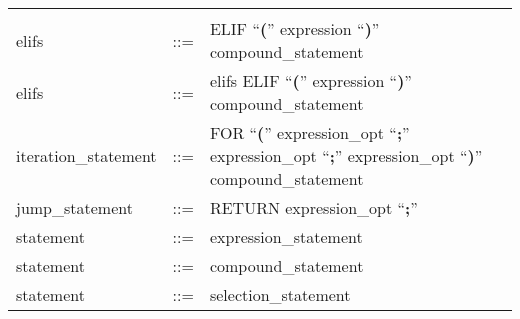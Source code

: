\begin{longtable}{lrl}
\begin{minipage}[t]{\rulerhs}
  \end{minipage}                                                             \\
elifs                                      & ::= &
  \begin{minipage}[t]{\rulerhs}
    \raggedright
    ELIF ``{\bf (}'' expression ``{\bf )}'' compound\_statement
  \end{minipage}                                                             \\
elifs                                      & ::= &
  \begin{minipage}[t]{\rulerhs}
    \raggedright
    elifs ELIF ``{\bf (}'' expression ``{\bf )}'' compound\_statement
  \end{minipage}                                                             \\
iteration\_statement                       & ::= &
  \begin{minipage}[t]{\rulerhs}
    \raggedright
    FOR ``{\bf (}'' expression\_opt ``{\bf ;}'' expression\_opt ``{\bf ;}'' expression\_opt ``{\bf )}'' compound\_statement
  \end{minipage}                                                             \\
jump\_statement                            & ::= &
  \begin{minipage}[t]{\rulerhs}
    \raggedright
    RETURN expression\_opt ``{\bf ;}''
  \end{minipage}                                                             \\
statement                                  & ::= &
  \begin{minipage}[t]{\rulerhs}
    \raggedright
    expression\_statement
  \end{minipage}                                                             \\
statement                                  & ::= &
  \begin{minipage}[t]{\rulerhs}
    \raggedright
    compound\_statement
  \end{minipage}                                                             \\
statement                                  & ::= &
  \begin{minipage}[t]{\rulerhs}
    \raggedright
    selection\_statement
  \end{minipage}                                                             \\

\end{longtable}
